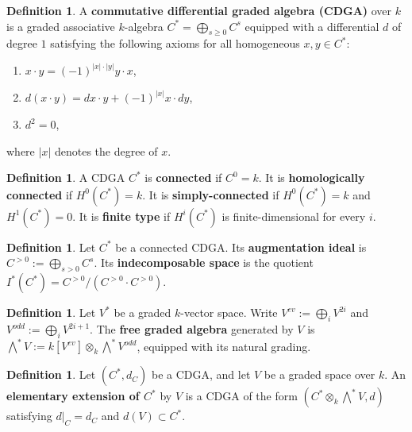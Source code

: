 \documentclass[11pt]{amsart}
\theoremstyle{definition}
\newtheorem{definition}[theorem]{Definition}
\numberwithin{equation}{section}
\numberwithin{equation}{section}
\begin{document}
\begin{definition}
A \textbf{commutative differential graded algebra (CDGA)} over $k$ is a graded associative $k$-algebra $C^*=\bigoplus_{s\geq 0}C^s$ equipped with a differential $d$ of degree $1$ satisfying the following axioms for all homogeneous $x,y\in C^*$:
\begin{enumerate}[leftmargin=0.25in]
    \item $x\cdot y=(-1)^{|x|\cdot |y|}y\cdot x$,
    \item $d(x\cdot y)=dx\cdot y+(-1)^{|x|}x\cdot dy$, 
    \item $d^2=0$,
\end{enumerate}
where $|x|$ denotes the degree of $x$.
\end{definition}

\begin{definition}\label{Def: finite type CDGA}
A CDGA $C^*$ is \textbf{connected} if $C^0=k$. It is \textbf{homologically connected} if $H^0(C^*)=k$. It is \textbf{simply-connected} if $H^0(C^*)=k$ and $H^1(C^*)=0$. It is \textbf{finite type} if $H^i(C^*)$ is finite-dimensional for every $i$.
\end{definition}

\begin{definition}
Let $C^*$ be a connected CDGA. Its \textbf{augmentation ideal} is $C^{>0}:=\bigoplus_{s>0} C^s$. Its \textbf{indecomposable space} is the quotient $I^*(C^*)=C^{>0}/(C^{>0}\cdot C^{>0})$.
\end{definition}

\begin{definition}
Let $V^*$ be a graded $k$-vector space. Write $V^{ev}:=\bigoplus_{i} V^{2i}$ and $V^{odd}:=\bigoplus_i V^{2i+1}$. The \textbf{free graded algebra} generated by $V$ is $\bigwedge^*V:=k[V^{ev}]\otimes_k \bigwedge^* V^{odd}$, equipped with its natural grading.
\end{definition}

\begin{definition}
Let $(C^*,d_{C})$ be a CDGA, and let $V$ be a graded space over $k$. An \textbf{elementary extension of $C^*$} by $V$ is a CDGA of the form $(C^*\otimes_{k} \bigwedge^* V,d)$ satisfying $d\vert_{C}=d_{C}$ and $d(V)\subset C^*$.
\end{definition}
\end{document}
